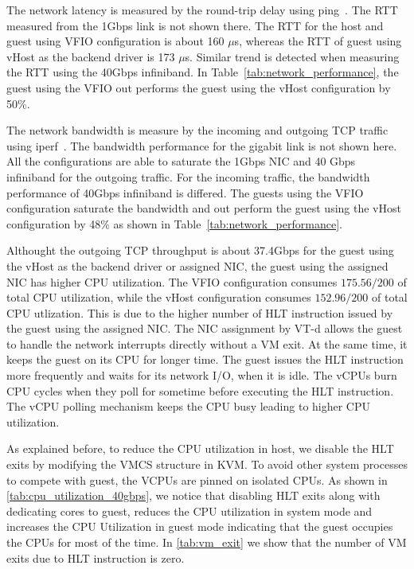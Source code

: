 The network latency is measured by the round-trip delay using
ping~\cite{ping}. The RTT measured from the 1Gbps link is not
shown there. The RTT for the host and guest using VFIO
configuration is about 160 $\mu$s, whereas the RTT of guest
using vHost as the backend driver is 173 $\mu$s. Similar trend
is detected when measuring the RTT using the 40Gbps
infiniband. In Table~\ref{tab:network_performance}, the guest
using the VFIO out performs the guest using the vHost
configuration by 50\%.

The network bandwidth is measure by the incoming and outgoing
TCP traffic using iperf~\cite{iperf}. The bandwidth
performance for the gigabit link is not shown here. All the
configurations are able to saturate the 1Gbps NIC and 40 Gbps
infiniband for the outgoing traffic. For the incoming traffic,
the bandwidth performance of 40Gbps infiniband is differed.
The guests using the VFIO configuration saturate the bandwidth
and out perform the guest using the vHost configuration by
48\% as shown in Table~\ref{tab:network_performance}.

Althought the outgoing TCP throughput is about 37.4Gbps for
the guest using the vHost as the backend driver or assigned
NIC, the guest using the assigned NIC has higher CPU
utilization. The VFIO configuration consumes $175.56/200$ of
total CPU utilization, while the vHost configuration consumes
$152.96/200$ of total CPU utlization. This is due to the
higher number of HLT instruction issued by the guest using the
assigned NIC. The NIC assignment by VT-d allows the guest to
handle the network interrupts directly without a VM exit. At
the same time, it keeps the guest on its CPU for longer time.
The guest issues the HLT instruction more frequently and waits
for its network I/O, when it is idle. The vCPUs burn CPU
cycles when they poll for sometime before executing the HLT
instruction. The vCPU polling mechanism keeps the CPU busy
leading to higher CPU utilization.

As explained before, to reduce the CPU utilization in host, we
disable the HLT exits by modifying the VMCS structure in KVM.
To avoid other system processes to compete with guest, the
VCPUs are pinned on isolated CPUs. As shown in
\ref{tab:cpu_utilization_40gbps}, we notice that disabling HLT
exits along with dedicating cores to guest, reduces the CPU
utilization in system mode and increases the CPU Utilization
in guest mode indicating that the guest occupies the CPUs for
most of the time. In \ref{tab:vm_exit} we show that the number
of VM exits due to HLT instruction is zero.

